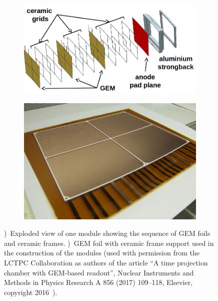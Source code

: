 \begin{figure}[htb!]
\begin{subfigure}[b]{0.52\textwidth}
\includegraphics[width=\textwidth]{Tracker/TPC_Bonn/plots/TPC-DG_GemModule_Explosion.png}
\caption{}
\label{sfig:moduleExp}
\end{subfigure}
\hfill
\begin{subfigure}[b]{0.44\textwidth}
\includegraphics[width=\textwidth]{Tracker/TPC_Bonn/plots/TPC-DG_GemGrid.png}
\caption{}
\label{sfig:moduleGEM}
\end{subfigure}
\caption [Readout Module GEM]{\small \protect{})~Exploded view of one module showing the sequence of GEM foils and ceramic frames. \protect{})~GEM foil with ceramic frame support used in the construction of the modules (used with permission from the LCTPC Collaboration as authors of the article ``A time projection chamber with GEM-based readout'', Nuclear Instruments and Methods in Physics Research A 856 (2017) 109–118, Elsevier, copyright 2016~\cite{FMueller2017}).}
\label{fig:moduleAssembled}
\end{figure}

